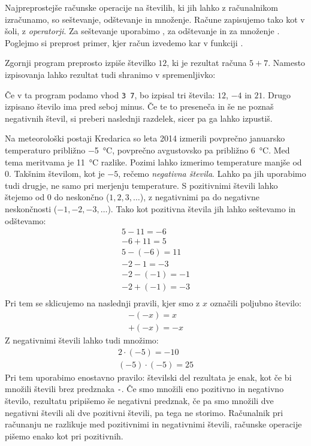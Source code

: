 
Najpreprostejše računske operacije na številih, ki jih lahko z računalnikom
izračunamo, so seštevanje, odštevanje in množenje.
Račune zapisujemo tako kot v šoli, z \emph{operatorji}.
Za seštevanje uporabimo \koda{+}, za odštevanje \koda{-} in za množenje \koda{*}.
Poglejmo si preprost primer, kjer račun izvedemo kar v funkciji .


Zgornji program preprosto izpiše številko $12$, ki je rezultat računa $5 + 7$.
Namesto izpisovanja lahko rezultat tudi shranimo v spremenljivko:


Če v ta program podamo vhod \verb+3 7+, bo izpisal tri števila: $12$, $-4$ in
$21$.
Drugo izpisano število ima pred seboj minus.
Če te to preseneča in še ne poznaš negativnih števil, si preberi naslednji
razdelek, sicer pa ga lahko izpustiš.


Na meteorološki postaji Kredarica so leta 2014 izmerili povprečno januarsko
temperaturo približno \SI{-5}{\celsius}, povprečno avgustovsko pa približno
\SI{6}{\celsius}.
Med tema meritvama je \SI{11}{\celsius} razlike.
Pozimi lahko izmerimo temperature manjše od 0.
Takšnim številom, kot je $-5$, rečemo \emph{negativna števila}.
Lahko pa jih uporabimo tudi drugje, ne samo pri merjenju temperature.
S pozitivnimi števili lahko štejemo od $0$ do neskončno ($1, 2, 3, \ldots$), z
negativnimi pa do negativne neskončnosti ($-1, -2, -3, \ldots$).
Tako kot pozitivna števila jih lahko seštevamo in odštevamo:
\begin{gather*}
  5 - 11 = -6 \\
  -6 + 11 = 5 \\
  5 -(-6) = 11 \\
  -2 - 1 = -3 \\
  -2 - (-1) = -1 \\
  -2 + (-1) = -3 \\
\end{gather*}
Pri tem se sklicujemo na naslednji pravili, kjer smo z $x$ označili poljubno
število:
\begin{gather*}
  -(-x) = x \\
  +(-x) = -x
\end{gather*}
Z negativnimi števili lahko tudi množimo:
\begin{gather*}
  2 \cdot (-5) = -10 \\
  (-5) \cdot (-5) = 25
\end{gather*}
Pri tem uporabimo enostavno pravilo: številski del rezultata je enak, kot če bi
množili števili brez predznaka \verb+-+.
Če smo množili eno pozitivno in negativno število, rezultatu pripišemo še
negativni predznak, če pa smo množili dve negativni števili ali dve pozitivni
števili, pa tega ne storimo.
Računalnik pri računanju ne razlikuje med pozitivnimi in negativnimi števili,
računske operacije pišemo enako kot pri pozitivnih.

